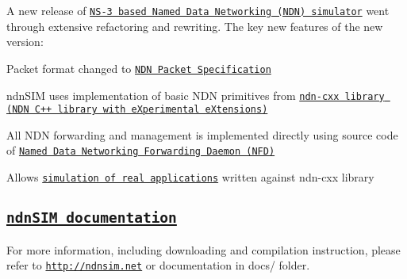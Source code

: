 \href{https://travis-ci.org/named-data-ndnSIM/ndnSIM}{\tt }

A new release of \href{http://ndnsim.net/1.0/}{\tt N\+S-\/3 based Named Data Networking (N\+DN) simulator} went through extensive refactoring and rewriting. The key new features of the new version\+:


\begin{DoxyItemize}
\item Packet format changed to \href{http://named-data.net/doc/ndn-tlv/}{\tt N\+DN Packet Specification}
\item ndn\+S\+IM uses implementation of basic N\+DN primitives from \href{http://named-data.net/doc/ndn-cxx/}{\tt ndn-\/cxx library (N\+DN C++ library with e\+Xperimental e\+Xtensions)}
\item All N\+DN forwarding and management is implemented directly using source code of \href{http://named-data.net/doc/NFD/}{\tt Named Data Networking Forwarding Daemon (N\+FD)}
\item Allows \href{http://ndnsim.net/2.1/guide-to-simulate-real-apps.html}{\tt simulation of real applications} written against ndn-\/cxx library
\end{DoxyItemize}

\subsection*{\href{http://ndnsim.net}{\tt ndn\+S\+IM documentation} }

For more information, including downloading and compilation instruction, please refer to \href{http://ndnsim.net}{\tt http\+://ndnsim.\+net} or documentation in {\ttfamily docs/} folder. 